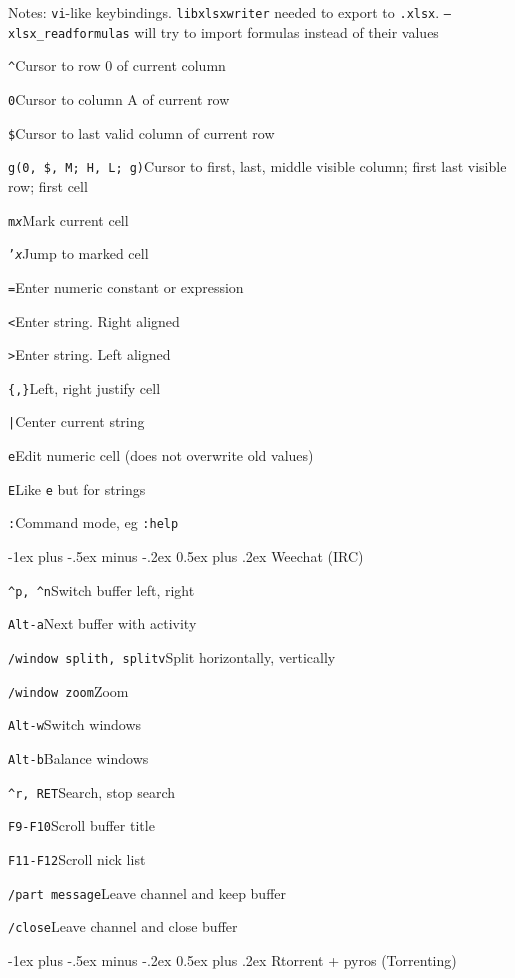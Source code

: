 \documentclass[12pt,landscape]{article}
\makeatletter
\renewcommand{\section}{\@startsection{section}{1}{0mm}%
                                {-1ex plus -.5ex minus -.2ex}%
                                {0.5ex plus .2ex}%
                                {\normalfont\large\bfseries}}
\def\cm#1#2{{\tt#1}\dotfill#2\par}
\makeatother
\begin{document}
\begin{multicols}{3}
Notes: \texttt{vi}-like keybindings. \texttt{libxlsxwriter} needed to export to \texttt{.xlsx}. \texttt{--xlsx\_readformulas} will try to import formulas instead of their values


\cm{\textasciicircum}{Cursor to row 0 of current column}

\cm{0}{Cursor to column A of current row}

\cm{\$}{Cursor to last valid column of current row}

\cm{g(0, \$, M; H, L; g)}{Cursor to first, last, middle visible column; first last visible row; first cell}

\cm{m\textit{x}}{Mark current cell}

\cm{'\textit{x}}{Jump to marked cell}

\cm{=}{Enter numeric constant or expression}

\cm{<}{Enter string. Right aligned}

\cm{>}{Enter string. Left aligned}

\cm{\{,\}}{Left, right justify cell}

\cm{|}{Center current string}

\cm{e}{Edit numeric cell (does not overwrite old values)}

\cm{E}{Like \texttt{e} but for strings}

\cm{:}{Command mode, eg \texttt{:help}}

\section{Weechat (IRC)}

\cm{\textasciicircum p, \textasciicircum n}{Switch buffer left, right}

\cm{Alt-a}{Next buffer with activity}

\cm{/window splith, splitv}{Split horizontally, vertically}

\cm{/window zoom}{Zoom}

\cm{Alt-w}{Switch windows}

\cm{Alt-b}{Balance windows}

\cm{\textasciicircum r, RET}{Search, stop search}

\cm{F9-F10}{Scroll buffer title}

\cm{F11-F12}{Scroll nick list}

\cm{/part message}{Leave channel and keep buffer}

\cm{/close}{Leave channel and close buffer}

\section{Rtorrent + pyros (Torrenting)}


\end{multicols}
\end{document}
